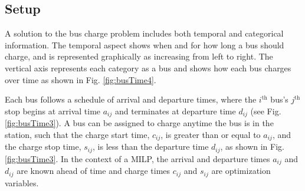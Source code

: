 \subsection{Setup}
\par A solution to the bus charge problem includes both temporal and categorical information. The temporal aspect shows when and for how long a bus should charge, and is represented graphically as increasing from left to right. The vertical axis represents each category as a bus and shows how each bus charges over time as shown in Fig. \ref{fig:busTime4}.
%
\par Each bus follows a schedule of arrival and departure times, where the $i^{\text{th}}$ bus's $j^{\text{th}}$ stop begins at arrival time $a_{ij}$ and terminates at departure time $d_{ij}$ (see Fig. \ref{fig:busTime3}).  A bus can be assigned to charge anytime the bus is in the station, such that the charge start time, $c_{ij}$, is greater than or equal to $a_{ij}$, and the charge stop time, $s_{ij}$, is less than the departure time $d_{ij}$, as shown in Fig. \ref{fig:busTime3}. In the context of a MILP, the arrival and departure times $a_{ij}$ and $d_{ij}$ are known ahead of time and charge times $c_{ij}$ and $s_{ij}$ are optimization variables. 

